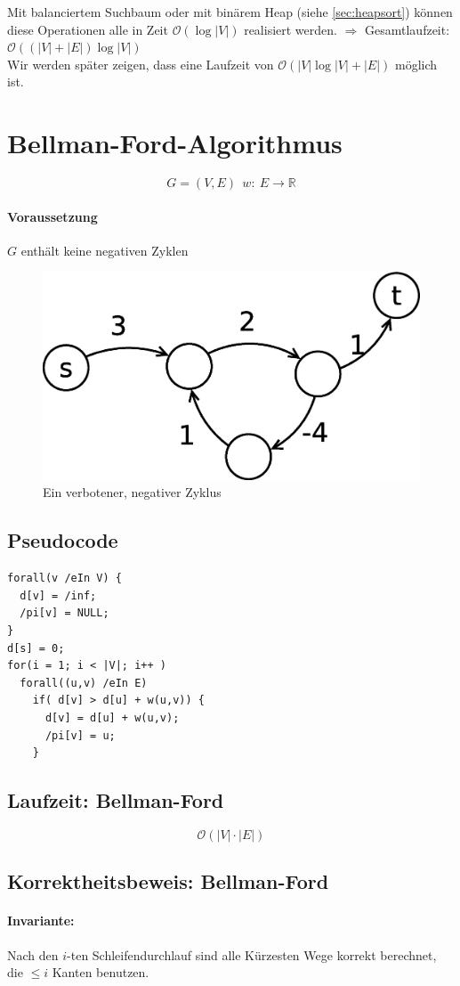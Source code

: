 Mit balanciertem Suchbaum oder mit binärem Heap (siehe \ref{sec:heapsort})
können diese Operationen alle in Zeit $\mathcal{O}(\log|V|)$ realisiert werden.
$\Rightarrow$ Gesamtlaufzeit: $\mathcal{O}((|V|+|E|)\log|V|)$\\
Wir werden später zeigen, dass eine Laufzeit von $\mathcal{O}(|V|\log|V|+|E|)$ möglich ist.
\section{Bellman-Ford-Algorithmus}
\[ G=(V,E)~~w:~E\rightarrow \mathbb{R} \]
\paragraph{Voraussetzung}
$G$ enthält keine negativen Zyklen
\begin{figure}[h]
\centering
\includegraphics[width=0.7\linewidth]{17/Grafik/Skizze3}
\caption{Ein verbotener, negativer Zyklus}
\label{fig:Skizze3}
\end{figure}
\subsection{Pseudocode}
\begin{lstlisting}[style = pseudo]
forall(v /eIn V) {
  d[v] = /inf;
  /pi[v] = NULL;
}
d[s] = 0;
for(i = 1; i < |V|; i++ )
  forall((u,v) /eIn E)
    if( d[v] > d[u] + w(u,v)) {
      d[v] = d[u] + w(u,v);
      /pi[v] = u;
    }
\end{lstlisting}
\subsection{Laufzeit: Bellman-Ford}
\[ \mathcal{O}(|V|\cdot|E|) \]
\subsection{Korrektheitsbeweis: Bellman-Ford}
\paragraph{Invariante:}
Nach den $i$-ten Schleifendurchlauf sind alle Kürzesten Wege korrekt berechnet, die $\leq i$ Kanten benutzen.
